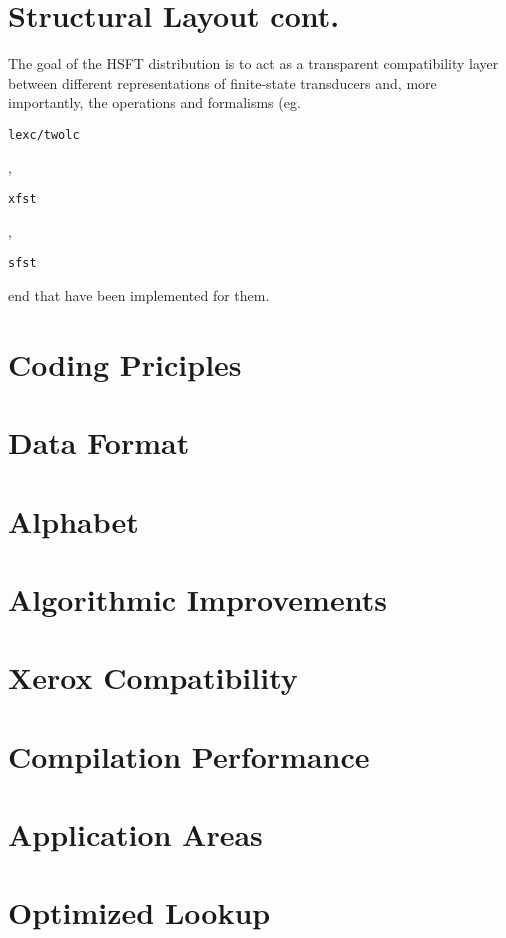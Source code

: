 \documentclass{llncs}
\begin{document}
\section*{Structural Layout cont.}
The goal of the HSFT distribution is to act as a transparent compatibility
layer between different representations of finite-state transducers and,
more importantly, the operations and formalisms (eg.
\begin{verbatim}lexc/twolc\end{verbatim}, \begin{verbatim}xfst\end{verbatim},
\begin{verbatim}sfst\end{verbatim} end that have been implemented
for them.

\section*{Coding Priciples}


\section*{Data Format}

\section*{Alphabet}

\section*{Algorithmic Improvements}

\section*{Xerox Compatibility}

\section*{Compilation Performance}

\section*{Application Areas}

\section*{Optimized Lookup}
\end{document}
